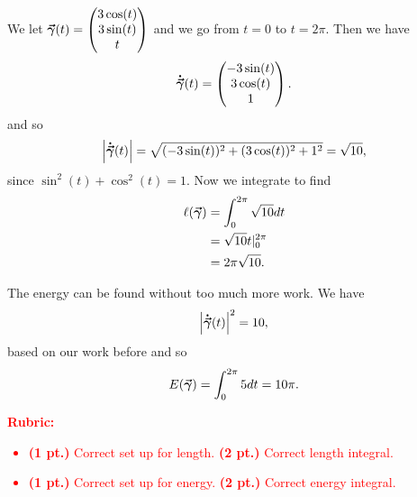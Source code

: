 \documentclass[12pt]{article} %
\begin{document}
\begin{solution}
We let $\boldsymbol{\vec{\gamma}}(t) = \begin{pmatrix} 3\cos (t) \\ 3\sin(t) \\ t\end{pmatrix}$ and we go from $t=0$ to $t=2\pi$. Then we have
\[
\boldsymbol{\dot{\vec{\gamma}}}(t) =\begin{pmatrix} -3\sin(t) \\ 3\cos(t) \\ 1\end{pmatrix}.
\]
and so
\[
\left|\boldsymbol{\dot{\vec{\gamma}}}(t)\right| = \sqrt{(-3\sin (t))^2+(3\cos (t))^2+1^2} = \sqrt{10},
\]
since $\sin^2(t)+\cos^2(t)=1$. Now we integrate to find
\begin{align*}
    \ell(\boldsymbol{\vec{\gamma}}) &= \int_0^{2\pi} \sqrt{10}dt\\
    &= \sqrt{10} t|_0^{2\pi}\\
    &= 2\pi \sqrt{10}.
\end{align*}

The energy can be found without too much more work. We have
\[
\left| \boldsymbol{\dot{\vec{\gamma}}}(t) \right|^2 = 10,
\]
based on our work before and so
\[
E(\boldsymbol{\vec{\gamma}}) = \int_0^{2\pi} 5 dt = 10 \pi.
\]
\end{solution}
\textcolor{red}{
\noindent \textbf{Rubric:}}
\textcolor{red}{
\begin{itemize}
\item \textbf{(1 pt.)} Correct set up for length. \textbf{(2 pt.)} Correct length integral.
\item \textbf{(1 pt.)} Correct set up for energy. \textbf{(2 pt.)} Correct energy integral.
\end{itemize}
}
\end{document}
